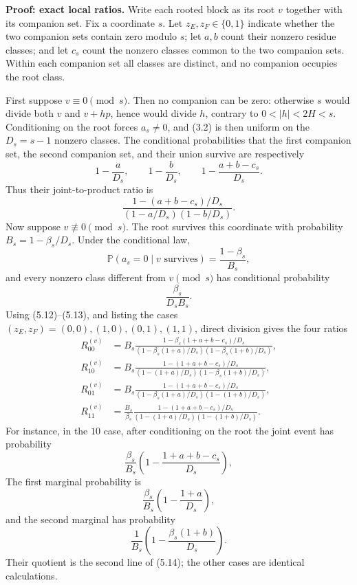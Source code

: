 \documentclass[10pt,letterpaper]{article}
\newcommand{\PP}{\mathbb{P}}
\begin{document}
\textbf{Proof: exact local ratios.} Write each rooted block as its root $v$ together with its companion set. Fix a
coordinate $s$. Let $z_E,z_F\in\{0,1\}$ indicate whether the two companion sets contain zero modulo $s$; let $a,b$ count
their nonzero residue classes; and let $c_s$ count the nonzero classes common to the two companion sets. Within
each companion set all classes are distinct, and no companion occupies the root class.

First suppose $v\equiv0\pmod s$. Then no companion can be zero: otherwise $s$ would divide both $v$ and $v+hp$,
hence would divide $h$, contrary to $0<|h|<2H<s$. Conditioning on the root forces $a_s\ne0$, and (3.2) is then
uniform on the $D_s=s-1$ nonzero classes. The conditional probabilities that the first companion set, the
second companion set, and their union survive are respectively
\[
1-\frac a{D_s},\qquad1-\frac b{D_s},\qquad1-\frac{a+b-c_s}{D_s}.
\]
Thus their joint-to-product ratio is
\begin{equation}
\frac{1-(a+b-c_s)/D_s}{(1-a/D_s)(1-b/D_s)}.
\tag{5.11}
\end{equation}
Now suppose $v\not\equiv0\pmod s$. The root survives this coordinate with probability $B_s=1-\beta_s/D_s$. Under the
conditional law,
\begin{equation}
\PP(a_s=0\mid v\text{ survives})=\frac{1-\beta_s}{B_s},
\tag{5.12}
\end{equation}
and every nonzero class different from $v\pmod s$ has conditional probability
\begin{equation}
\frac{\beta_s}{D_sB_s}.
\tag{5.13}
\end{equation}
Using (5.12)--(5.13), and listing the cases $(z_E,z_F)=(0,0),(1,0),(0,1),(1,1)$, direct division gives the four
ratios
\begin{equation}
\begin{aligned}
R_{00}^{(v)}&=B_s\frac{1-\beta_s(1+a+b-c_s)/D_s}
{(1-\beta_s(1+a)/D_s)(1-\beta_s(1+b)/D_s)},\\
R_{10}^{(v)}&=B_s\frac{1-(1+a+b-c_s)/D_s}
{(1-(1+a)/D_s)(1-\beta_s(1+b)/D_s)},\\
R_{01}^{(v)}&=B_s\frac{1-(1+a+b-c_s)/D_s}
{(1-\beta_s(1+a)/D_s)(1-(1+b)/D_s)},\\
R_{11}^{(v)}&=\frac{B_s}{\beta_s}\frac{1-(1+a+b-c_s)/D_s}
{(1-(1+a)/D_s)(1-(1+b)/D_s)}.
\end{aligned}
\tag{5.14}
\end{equation}
For instance, in the $10$ case, after conditioning on the root the joint event has probability
\[
\frac{\beta_s}{B_s}\left(1-\frac{1+a+b-c_s}{D_s}\right),
\]
The first marginal probability is
\[
\frac{\beta_s}{B_s}\left(1-\frac{1+a}{D_s}\right),
\]
and the second marginal has probability
\[
\frac1{B_s}\left(1-\frac{\beta_s(1+b)}{D_s}\right).
\]
Their quotient is the second line of (5.14); the other cases are identical calculations.
\end{document}
